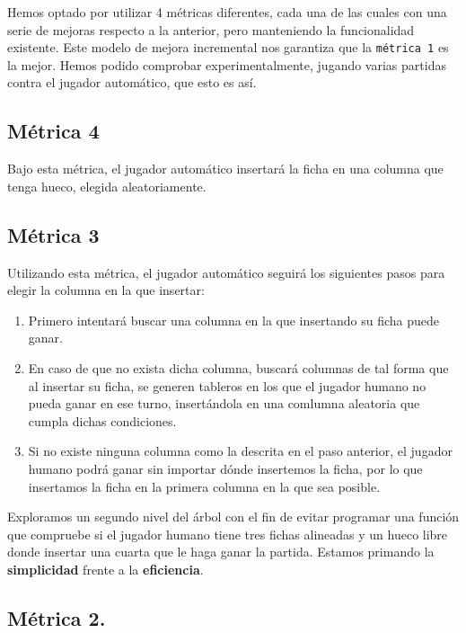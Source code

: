 \documentclass[11pt]{article}
\begin{document}
Hemos optado por utilizar 4 métricas diferentes, cada una de las cuales con una serie de mejoras
respecto a la anterior, pero manteniendo la funcionalidad existente. Este modelo de mejora incremental nos garantiza que la \texttt{métrica 1} es la mejor. Hemos podido comprobar experimentalmente, jugando varias partidas contra el jugador automático, que esto es así.

\subsection{Métrica 4}
\label{sec-2-1}

Bajo esta métrica, el jugador automático insertará la ficha en una columna que tenga hueco, elegida aleatoriamente.

\subsection{Métrica 3}
\label{sec-2-2}

Utilizando esta métrica, el jugador automático seguirá los siguientes pasos para elegir la columna en la que insertar:

\begin{enumerate}
\item Primero intentará buscar una columna en la que insertando su ficha puede ganar.
\item En caso de que no exista dicha columna, buscará columnas de tal forma que al insertar su ficha, se generen tableros en los que el jugador humano no pueda ganar en ese turno, insertándola en una comlumna aleatoria que cumpla dichas condiciones.
\item Si no existe ninguna columna como la descrita en el paso anterior, el jugador humano podrá ganar sin importar dónde insertemos la ficha, por lo que insertamos la ficha en la primera columna en la que sea posible.
\end{enumerate}

Exploramos un segundo nivel del árbol con el fin de evitar programar una función que compruebe si el jugador humano tiene tres fichas alineadas y un hueco libre donde insertar una cuarta que le haga ganar la partida. Estamos primando la \textbf{\textbf{simplicidad}} frente a la \textbf{\textbf{eficiencia}}.

\subsection{Métrica 2.}
\label{sec-2-3}
\end{document}

